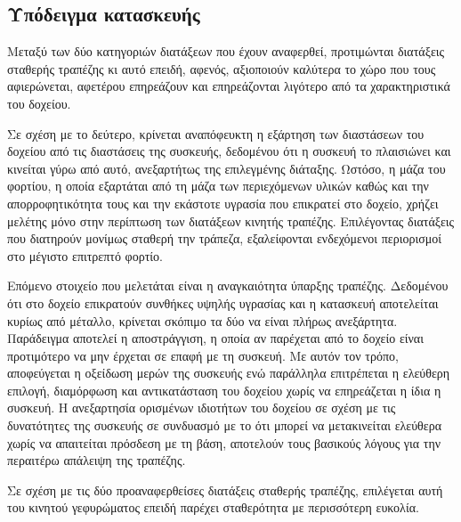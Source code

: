 \subsection{Υπόδειγμα κατασκευής}

Μεταξύ των δύο κατηγοριών διατάξεων που έχουν αναφερθεί, προτιμώνται διατάξεις
σταθερής τραπέζης κι αυτό επειδή, αφενός, αξιοποιούν καλύτερα το χώρο που τους
αφιερώνεται, αφετέρου επηρεάζουν και επηρεάζονται λιγότερο από τα χαρακτηριστικά
του δοχείου.

Σε σχέση με το δεύτερο, κρίνεται αναπόφευκτη η εξάρτηση των διαστάσεων του
δοχείου από τις διαστάσεις της συσκευής, δεδομένου ότι η συσκευή το πλαισιώνει
και κινείται γύρω από αυτό, ανεξαρτήτως της επιλεγμένης διάταξης. Ωστόσο, η μάζα
του φορτίου, η οποία εξαρτάται από τη μάζα των περιεχόμενων υλικών καθώς και την
απορροφητικότητα τους και την εκάστοτε υγρασία που επικρατεί στο δοχείο, χρήζει
μελέτης μόνο στην περίπτωση των διατάξεων κινητής τραπέζης. Επιλέγοντας
διατάξεις που διατηρούν μονίμως σταθερή την τράπεζα, εξαλείφονται ενδεχόμενοι
περιορισμοί στο μέγιστο επιτρεπτό φορτίο.
%
%
%

Επόμενο στοιχείο που μελετάται είναι η αναγκαιότητα ύπαρξης τραπέζης. Δεδομένου
ότι στο δοχείο επικρατούν συνθήκες υψηλής υγρασίας και η κατασκευή αποτελείται
κυρίως από μέταλλο, κρίνεται σκόπιμο τα δύο να είναι πλήρως ανεξάρτητα.
Παράδειγμα αποτελεί η αποστράγγιση, η οποία αν παρέχεται από το δοχείο είναι
προτιμότερο να μην έρχεται σε επαφή με τη συσκευή.
Με αυτόν τον τρόπο, αποφεύγεται η οξείδωση μερών της συσκευής ενώ παράλληλα
επιτρέπεται η ελεύθερη επιλογή, διαμόρφωση και αντικατάσταση του δοχείου χωρίς
να επηρεάζεται η ίδια η συσκευή.
Η ανεξαρτησία ορισμένων ιδιοτήτων του δοχείου σε σχέση με τις δυνατότητες της
συσκευής σε συνδυασμό με το ότι μπορεί να μετακινείται ελεύθερα χωρίς να
απαιτείται πρόσδεση με τη βάση, αποτελούν τους βασικούς λόγους
για την περαιτέρω απάλειψη της τραπέζης.

Σε σχέση με τις δύο προαναφερθείσες διατάξεις σταθερής τραπέζης, επιλέγεται αυτή
του κινητού γεφυρώματος επειδή παρέχει σταθερότητα με περισσότερη ευκολία.



